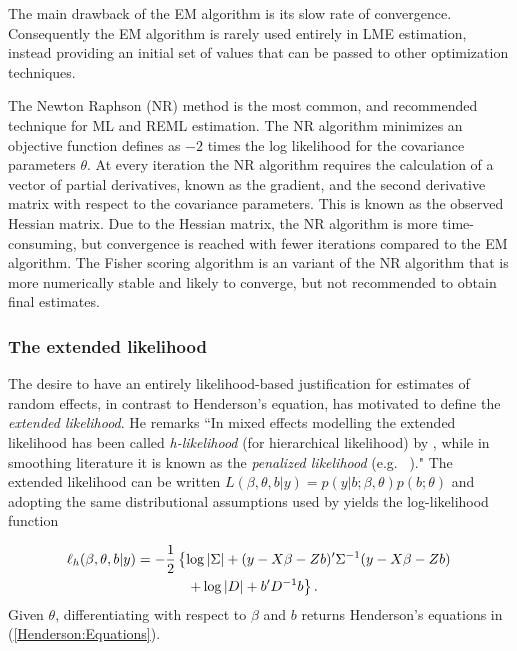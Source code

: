 \documentclass[MAIN.tex]{subfiles}
\begin{document}
	The main drawback of the EM algorithm is its slow rate of
	convergence. Consequently the EM algorithm is rarely used entirely in LME estimation,
	instead providing an initial set of values that can be passed to
	other optimization techniques.
	
	The Newton Raphson (NR) method is the most common, and recommended technique for ML and
	REML estimation. The NR algorithm minimizes an objective function defines as $-2$ times the log likelihood for the covariance parameters $\theta$. At every iteration the NR algorithm requires the
	calculation of a vector of partial derivatives, known as the gradient, and the second derivative matrix with respect to the covariance parameters. This is known as the observed Hessian matrix. Due to the Hessian matrix, the NR algorithm is more time-consuming, but convergence is reached with fewer iterations compared to the EM algorithm. The Fisher scoring algorithm is an variant of the NR algorithm that is more numerically stable and likely to converge, but not recommended to obtain final estimates.
	
	\subsubsection{The extended likelihood}
	
	The desire to have an entirely likelihood-based justification for estimates of random effects, in contrast to Henderson's equation, has motivated \citet[page 429]{Pawi:in:2001} to define the \emph{extended likelihood}. He remarks ``In mixed effects modelling the extended likelihood has been called \emph{h-likelihood} (for hierarchical  likelihood) by \cite{Lee:Neld:hier:1996}, while in smoothing literature it is known as the \emph{penalized likelihood} (e.g.\ \citeauthor{Gree:Silv:nonp:1994} \citeyear{Gree:Silv:nonp:1994})." The extended likelihood can be written $L(\beta,\theta,b|y) = p(y|b;\beta,\theta) p(b;\theta)$ and adopting the same distributional assumptions used by \cite{Henderson:1950} yields the log-likelihood function
	
	\begin{eqnarray*}
		\ell_h(\beta,\theta,b|y)
		& = \displaystyle -\frac{1}{2} \left\{ \log|\Sigma| + (y - X \beta -Zb)'\Sigma^{-1}( y - X \beta -Zb) \right.\\
		&  \hspace{0.5in} \left. + \log|D| + b^\prime D^{-1}b \right\}.
	\end{eqnarray*}
	Given $\theta$, differentiating with respect to $\beta$ and $b$ returns Henderson's equations in (\ref{Henderson:Equations}).
	
\end{document}
